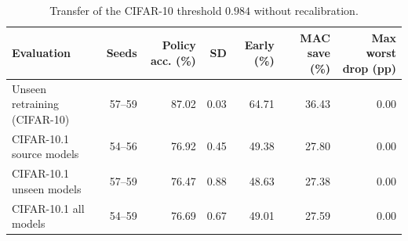 \begin{table}[t]
\centering
\small
\caption{Transfer of the CIFAR-10 threshold $0.984$ without recalibration.}
\label{tab:transfer}
\begin{tabular}{lrrrrrr}
\toprule
Evaluation & Seeds & Policy acc. (\%) & SD & Early (\%) & MAC save (\%) & Max worst drop (pp) \\
\midrule
Unseen retraining (CIFAR-10) & 57--59 & 87.02 & 0.03 & 64.71 & 36.43 & 0.00 \\
CIFAR-10.1 source models & 54--56 & 76.92 & 0.45 & 49.38 & 27.80 & 0.00 \\
CIFAR-10.1 unseen models & 57--59 & 76.47 & 0.88 & 48.63 & 27.38 & 0.00 \\
CIFAR-10.1 all models & 54--59 & 76.69 & 0.67 & 49.01 & 27.59 & 0.00 \\
\bottomrule
\end{tabular}
\end{table}
